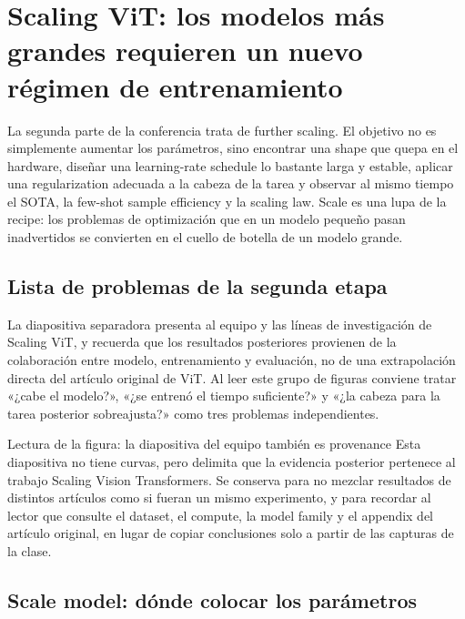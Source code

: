 \section{Scaling ViT: los modelos más grandes requieren un nuevo régimen de entrenamiento}

La segunda parte de la conferencia trata de further scaling. El objetivo no es simplemente aumentar los parámetros, sino encontrar una shape que quepa en el hardware, diseñar una learning-rate schedule lo bastante larga y estable, aplicar una regularization adecuada a la cabeza de la tarea y observar al mismo tiempo el SOTA, la few-shot sample efficiency y la scaling law. Scale es una lupa de la recipe: los problemas de optimización que en un modelo pequeño pasan inadvertidos se convierten en el cuello de botella de un modelo grande.

\subsection{Lista de problemas de la segunda etapa}

La diapositiva separadora presenta al equipo y las líneas de investigación de Scaling ViT, y recuerda que los resultados posteriores provienen de la colaboración entre modelo, entrenamiento y evaluación, no de una extrapolación directa del artículo original de ViT. Al leer este grupo de figuras conviene tratar «¿cabe el modelo?», «¿se entrenó el tiempo suficiente?» y «¿la cabeza para la tarea posterior sobreajusta?» como tres problemas independientes.


\begin{knowledgebox}{Lectura de la figura: la diapositiva del equipo también es provenance}
Esta diapositiva no tiene curvas, pero delimita que la evidencia posterior pertenece al trabajo Scaling Vision Transformers. Se conserva para no mezclar resultados de distintos artículos como si fueran un mismo experimento, y para recordar al lector que consulte el dataset, el compute, la model family y el appendix del artículo original, en lugar de copiar conclusiones solo a partir de las capturas de la clase.
\end{knowledgebox}

\subsection{Scale model: dónde colocar los parámetros}

